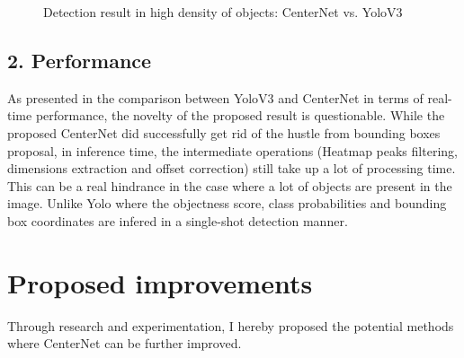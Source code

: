 \documentclass[12pt]{article}
\begin{document}
\begin{figure}[H]%
    \centering
    \qquad
    \caption{Detection result in high density of objects: CenterNet vs. YoloV3}%
    \label{fig:example}%
\end{figure}

\subsection*{2. Performance}
As presented in the comparison between YoloV3 and CenterNet in terms of real-time performance, the novelty of the proposed result is questionable. While the proposed CenterNet did successfully get rid of the hustle from bounding boxes proposal, in inference time, the intermediate operations (Heatmap peaks filtering, dimensions extraction and offset correction) still take up a lot of processing time. This can be a real hindrance in the case where a lot of objects are present in the image. Unlike Yolo where the objectness score, class probabilities and bounding box coordinates are infered in a single-shot detection manner.

\section*{Proposed improvements}
Through research and experimentation, I hereby proposed the potential methods where CenterNet can be further improved.\newpage
\end{document}
